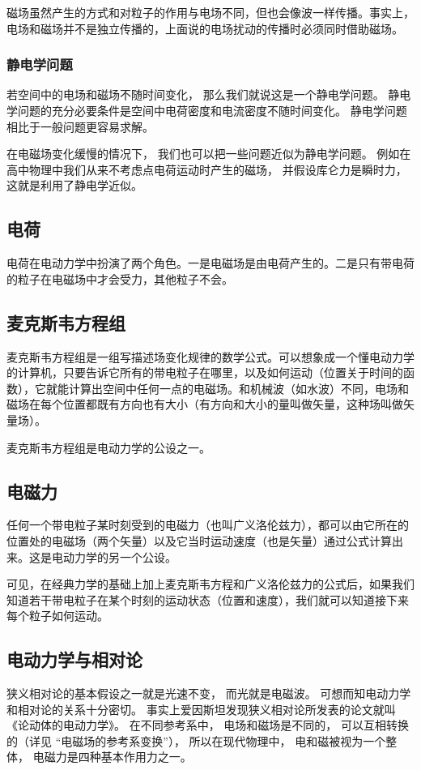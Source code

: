 磁场虽然产生的方式和对粒子的作用与电场不同，但也会像波一样传播。事实上，电场和磁场并不是独立传播的，上面说的电场扰动的传播时必须同时借助磁场。

\subsubsection{静电学问题}
若空间中的电场和磁场不随时间变化， 那么我们就说这是一个静电学问题。 静电学问题的充分必要条件是空间中电荷密度和电流密度不随时间变化。 静电学问题相比于一般问题更容易求解。

在电磁场变化缓慢的情况下， 我们也可以把一些问题近似为静电学问题。 例如在高中物理中我们从来不考虑点电荷运动时产生的磁场， 并假设库仑力是瞬时力， 这就是利用了静电学近似。

\subsection{电荷}
电荷在电动力学中扮演了两个角色。一是电磁场是由电荷产生的。二是只有带电荷的粒子在电磁场中才会受力，其他粒子不会。

\subsection{麦克斯韦方程组}
麦克斯韦方程组是一组写描述场变化规律的数学公式。可以想象成一个懂电动力学的计算机，只要告诉它所有的带电粒子在哪里，以及如何运动（位置关于时间的函数），它就能计算出空间中任何一点的电磁场。和机械波（如水波）不同，电场和磁场在每个位置都既有方向也有大小（有方向和大小的量叫做矢量，这种场叫做矢量场）。

麦克斯韦方程组是电动力学的公设之一。

\subsection{电磁力}
任何一个带电粒子某时刻受到的电磁力（也叫广义洛伦兹力），都可以由它所在的位置处的电磁场（两个矢量）以及它当时运动速度（也是矢量）通过公式计算出来。这是电动力学的另一个公设。

可见，在经典力学的基础上加上麦克斯韦方程和广义洛伦兹力的公式后，如果我们知道若干带电粒子在某个时刻的运动状态（位置和速度），我们就可以知道接下来每个粒子如何运动。

\subsection{电动力学与相对论}
狭义相对论的基本假设之一就是光速不变， 而光就是电磁波。 可想而知电动力学和相对论的关系十分密切。 事实上爱因斯坦发现狭义相对论所发表的论文就叫《论动体的电动力学》。 在不同参考系中， 电场和磁场是不同的， 可以互相转换的（详见 “电磁场的参考系变换”）， 所以在现代物理中， 电和磁被视为一个整体， 电磁力是四种基本作用力之一。
